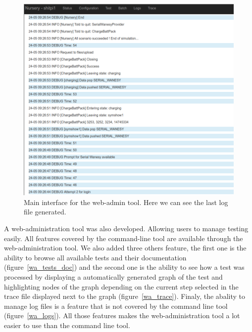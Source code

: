 \documentclass[12pt]{article}
\begin{document}
\begin{figure}
    \centering
    \includegraphics[scale=0.4]{wa_status.png}
    \caption{Main interface for the web-admin tool. Here we can see the last log file generated.}
    \label{wa_status}
\end{figure}

A web-administration tool was also developed. Allowing users to manage testing easily. All features covered by the command-line tool are available through the web-administration tool. We also added three others feature, the first one is the ability to browse all available tests and their documentation (figure~\ref{wa_tests_doc}) and the second one is the ability to see how a test was processed by displaying a automatically generated graph of the test and highlighting nodes of the graph depending on the current step selected in the trace file displayed next to the graph (figure~\ref{wa_trace}). Finaly, the abality to manage log files is a feature that is not covered by the command line tool (figure~\ref{wa_logs}). All those features makes the web-administration tool a lot easier to use than the command line tool.\\
\end{document}
